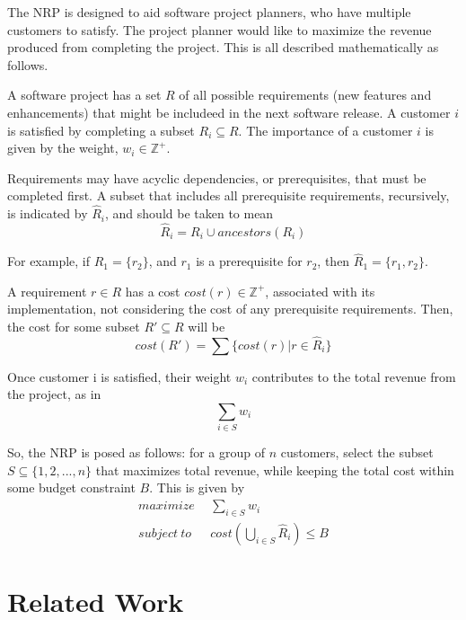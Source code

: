 \documentclass[a4paper]{scrartcl}
\begin{document}
The NRP is designed to aid software project planners, who have multiple customers to satisfy. The project planner would like to maximize the revenue produced from completing the project. This is all described mathematically as follows.

A software project has a set $R$ of all possible requirements (new features and enhancements) that might be includeed in the next software release. A customer $i$ is satisfied by completing a subset $R_i \subseteq R$. The importance of a customer $i$ is given by the weight, $w_i \in \mathbb{Z}^+$.

Requirements may have acyclic dependencies, or prerequisites, that must be completed first. A subset that includes all prerequisite requirements, recursively, is indicated by $\hat{R}_i$, and should be taken to mean
\begin{equation}
\hat{R}_i = R_i \cup ancestors(R_i)
\end{equation}

For example, if $R_1 = \{r_2\}$, and $r_1$ is a prerequisite for $r_2$, then $\hat{R}_1 = \{r_1,r_2\}$.

A requirement $r \in R$ has a cost $cost(r) \in \mathbb{Z}^+$, associated with its implementation, not considering the cost of any prerequisite requirements. Then, the cost for some subset $R' \subseteq R$ will be
\begin{equation}
cost(R') = \sum \{cost(r) | r \in \hat{R}_i \}
\end{equation}

Once customer i is satisfied, their weight $w_i$ contributes to the total revenue from the project, as in
\begin{equation}
\sum_{i \in S} w_i
\end{equation}

So, the NRP is posed as follows: for a group of $n$ customers, select the subset $S \subseteq \{ 1,2,...,n \}$ that maximizes total revenue, while keeping the total cost within some budget constraint $B$. This is given by 
\begin{equation}
\begin{split}
maximize~~& \sum_{i \in S} w_i \\
subject~to~~~& cost(\bigcup_{i \in S} \hat{R}_i) \le B
\end{split}
\end{equation}

\section{Related Work}
\end{document}
